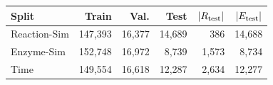 \begingroup\setlength{\tabcolsep}{2.8pt}
\begin{tabular}{@{}lrrrrr@{}}
\toprule
Split & Train & Val. & Test & $|R_{\rm test}|$ & $|E_{\rm test}|$ \\
\midrule
Reaction-Sim & 147,393 & 16,377 & 14,689 & 386 & 14,688 \\
Enzyme-Sim & 152,748 & 16,972 & 8,739 & 1,573 & 8,734 \\
Time & 149,554 & 16,618 & 12,287 & 2,634 & 12,277 \\
\bottomrule
\end{tabular}
\endgroup
